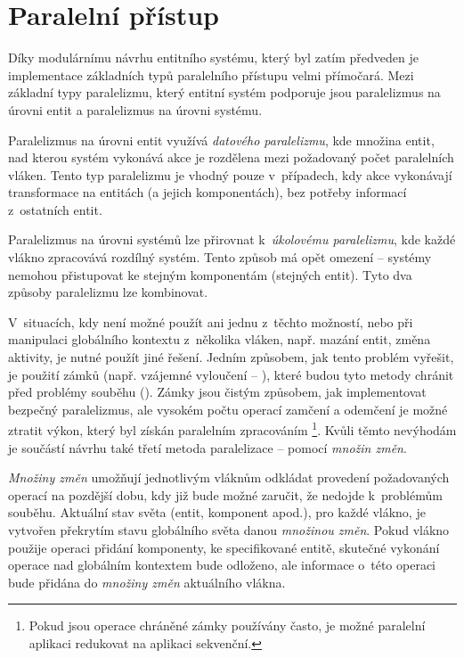 \section{Paralelní přístup}

Díky modulárnímu návrhu entitního systému, který byl zatím předveden je implementace základních typů paralelního přístupu velmi přímočará. Mezi základní typy paralelizmu, který entitní systém podporuje jsou paralelizmus na úrovni entit a paralelizmus na úrovni systému.

Paralelizmus na úrovni entit využívá \emph{datového paralelizmu}, kde množina entit, nad kterou systém vykonává akce je rozdělena mezi požadovaný počet paralelních vláken. Tento typ paralelizmu je vhodný pouze v~případech, kdy akce vykonávají transformace na entitách (a jejich komponentách), bez potřeby informací z~ostatních entit. 

Paralelizmus na úrovni systémů lze přirovnat k~\emph{úkolovému paralelizmu}, kde každé vlákno zpracovává rozdílný systém. Tento způsob má opět omezení -- systémy nemohou přistupovat ke stejným komponentám (stejných entit). Tyto dva způsoby paralelizmu lze kombinovat.

V~situacích, kdy není možné použít ani jednu z~těchto možností, nebo při manipulaci globálního kontextu z~několika vláken, např. mazání entit, změna aktivity, je nutné použít jiné řešení. Jedním způsobem, jak tento problém vyřešit, je použití zámků (např. vzájemné vyloučení -- ), které budou tyto metody chránit před problémy souběhu (). Zámky jsou čistým způsobem, jak implementovat bezpečný paralelizmus, ale vysokém počtu operací zamčení a odemčení je možné ztratit výkon, který byl získán paralelním zpracováním \footnote{Pokud jsou operace chráněné zámky používány často, je možné paralelní aplikaci redukovat na aplikaci sekvenční.}. Kvůli těmto nevýhodám je součástí návrhu také třetí metoda paralelizace -- pomocí \emph{množin změn}.

\emph{Množiny změn} umožňují jednotlivým vláknům odkládat provedení požadovaných operací na pozdější dobu, kdy již bude možné zaručit, že nedojde k~problémům souběhu. Aktuální stav světa (entit, komponent apod.), pro každé vlákno, je vytvořen překrytím stavu globálního světa danou \emph{množinou změn}. Pokud vlákno použije operaci přidání komponenty, ke specifikované entitě, skutečné vykonání operace nad globálním kontextem bude odloženo, ale informace o~této operaci bude přidána do \emph{množiny změn} aktuálního vlákna.

